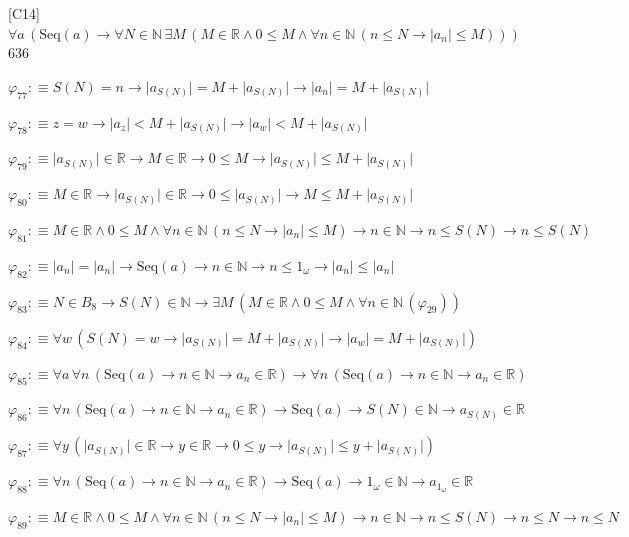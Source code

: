 \begin{fullproof}{[C14]}{$\forall a\,(\mathrm{Seq}(a) \to \forall N \in \mathbb{N}\,\exists M\,(M \in \mathbb{R} \land 0 \leq M \land \forall n \in \mathbb{N}\,(n \leq N \to \lvert a_{n} \rvert \leq M)))$}{636}
\begin{abbrevlist}
\item $\varphi_{77} :\equiv S(N) = n \to \lvert a_{S(N)} \rvert = M + \lvert a_{S(N)} \rvert \to \lvert a_{n} \rvert = M + \lvert a_{S(N)} \rvert$
\item $\varphi_{78} :\equiv z = w \to \lvert a_{z} \rvert < M + \lvert a_{S(N)} \rvert \to \lvert a_{w} \rvert < M + \lvert a_{S(N)} \rvert$
\item $\varphi_{79} :\equiv \lvert a_{S(N)} \rvert \in \mathbb{R} \to M \in \mathbb{R} \to 0 \leq M \to \lvert a_{S(N)} \rvert \leq M + \lvert a_{S(N)} \rvert$
\item $\varphi_{80} :\equiv M \in \mathbb{R} \to \lvert a_{S(N)} \rvert \in \mathbb{R} \to 0 \leq \lvert a_{S(N)} \rvert \to M \leq M + \lvert a_{S(N)} \rvert$
\item $\varphi_{81} :\equiv M \in \mathbb{R} \land 0 \leq M \land \forall n \in \mathbb{N}\,(n \leq N \to \lvert a_{n} \rvert \leq M) \to n \in \mathbb{N} \to n \leq S(N) \to n \leq S(N)$
\item $\varphi_{82} :\equiv \lvert a_{n} \rvert = \lvert a_{n} \rvert \to \mathrm{Seq}(a) \to n \in \mathbb{N} \to n \leq 1_{\omega} \to \lvert a_{n} \rvert \leq \lvert a_{n} \rvert$
\item $\varphi_{83} :\equiv N \in B_{8} \to S(N) \in \mathbb{N} \to \exists M\,(M \in \mathbb{R} \land 0 \leq M \land \forall n \in \mathbb{N}\,(\varphi_{29}))$
\item $\varphi_{84} :\equiv \forall w\,(S(N) = w \to \lvert a_{S(N)} \rvert = M + \lvert a_{S(N)} \rvert \to \lvert a_{w} \rvert = M + \lvert a_{S(N)} \rvert)$
\item $\varphi_{85} :\equiv \forall a\,\forall n\,(\mathrm{Seq}(a) \to n \in \mathbb{N} \to a_{n} \in \mathbb{R}) \to \forall n\,(\mathrm{Seq}(a) \to n \in \mathbb{N} \to a_{n} \in \mathbb{R})$
\item $\varphi_{86} :\equiv \forall n\,(\mathrm{Seq}(a) \to n \in \mathbb{N} \to a_{n} \in \mathbb{R}) \to \mathrm{Seq}(a) \to S(N) \in \mathbb{N} \to a_{S(N)} \in \mathbb{R}$
\item $\varphi_{87} :\equiv \forall y\,(\lvert a_{S(N)} \rvert \in \mathbb{R} \to y \in \mathbb{R} \to 0 \leq y \to \lvert a_{S(N)} \rvert \leq y + \lvert a_{S(N)} \rvert)$
\item $\varphi_{88} :\equiv \forall n\,(\mathrm{Seq}(a) \to n \in \mathbb{N} \to a_{n} \in \mathbb{R}) \to \mathrm{Seq}(a) \to 1_{\omega} \in \mathbb{N} \to a_{1_{\omega}} \in \mathbb{R}$
\item $\varphi_{89} :\equiv M \in \mathbb{R} \land 0 \leq M \land \forall n \in \mathbb{N}\,(n \leq N \to \lvert a_{n} \rvert \leq M) \to n \in \mathbb{N} \to n \leq S(N) \to n \leq N \to n \leq N$

\end{abbrevlist}
\end{fullproof}
